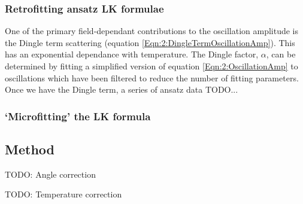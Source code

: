 \subsubsection{Retrofitting ansatz LK formulae}
\label{Sec:2:LKRetrofitting}

One of the primary field-dependant contributions to the oscillation amplitude is the Dingle term scattering (equation \ref{Eqn:2:DingleTermOscillationAmp}). This has an exponential dependance with temperature. The Dingle factor, $\alpha$, can be determined by fitting a simplified version of equation \ref{Eqn:2:OscillationAmp} to oscillations which have been filtered to reduce the number of fitting parameters. Once we have the Dingle term, a series of ansatz data TODO...




\subsubsection{`Microfitting' the LK formula}
\label{Sec:2:LKMicrofitting}

\subsection{Method}

TODO: Angle correction

TODO: Temperature correction

